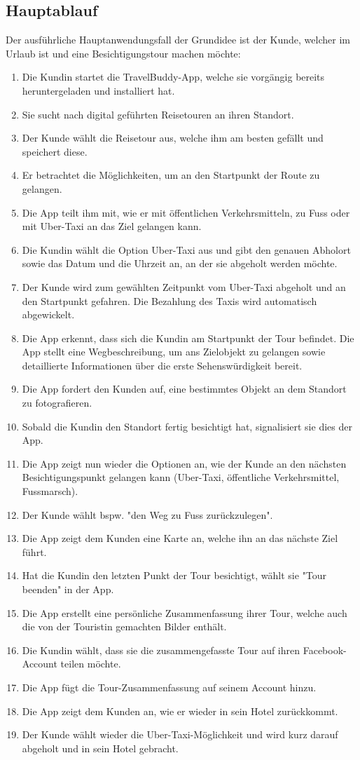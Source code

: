\subsection{Hauptablauf}\label{Hauptablauf}
Der ausführliche Hauptanwendungsfall der Grundidee ist der Kunde, welcher im Urlaub ist und eine Besichtigungstour machen möchte:
\begin{enumerate}
\item Die Kundin startet die TravelBuddy-App, welche sie vorgängig bereits heruntergeladen und installiert hat.
\item Sie sucht nach digital geführten Reisetouren an ihren Standort.
\item Der Kunde wählt die Reisetour aus, welche ihm am besten gefällt und speichert diese.
\item Er betrachtet die Möglichkeiten, um an den Startpunkt der Route zu gelangen.
\item Die App teilt ihm mit, wie er mit öffentlichen Verkehrsmitteln, zu Fuss oder mit Uber-Taxi an das Ziel gelangen kann.
\item Die Kundin wählt die Option Uber-Taxi aus und gibt den genauen Abholort sowie das Datum und die Uhrzeit an, an der sie abgeholt werden möchte.
\item Der Kunde wird zum gewählten Zeitpunkt vom Uber-Taxi abgeholt und an den Startpunkt gefahren. Die Bezahlung des Taxis wird automatisch abgewickelt.
\item Die App erkennt, dass sich die Kundin am Startpunkt der Tour befindet. Die App stellt eine Wegbeschreibung, um ans Zielobjekt zu gelangen sowie detaillierte Informationen über die erste Sehenswürdigkeit bereit.
\item Die App fordert den Kunden auf, eine bestimmtes Objekt an dem Standort zu fotografieren.
\item Sobald die Kundin den Standort fertig besichtigt hat, signalisiert sie dies der App.
\item Die App zeigt nun wieder die Optionen an, wie der Kunde an den nächsten Besichtigungspunkt gelangen kann (Uber-Taxi, öffentliche Verkehrsmittel, Fussmarsch).
\item Der Kunde wählt bspw. "den Weg zu Fuss zurückzulegen".
\item Die App zeigt dem Kunden eine Karte an, welche ihn an das nächste Ziel führt.
\item Hat die Kundin den letzten Punkt der Tour besichtigt, wählt sie "Tour beenden" in der App.
\item Die App erstellt eine persönliche Zusammenfassung ihrer Tour, welche auch die von der Touristin gemachten Bilder enthält.
\item Die Kundin wählt, dass sie die zusammengefasste Tour auf ihren Facebook-Account teilen möchte.
\item Die App fügt die Tour-Zusammenfassung auf seinem Account hinzu.
\item Die App zeigt dem Kunden an, wie er wieder in sein Hotel zurückkommt.
\item Der Kunde wählt wieder die Uber-Taxi-Möglichkeit und wird kurz darauf abgeholt und in sein Hotel gebracht.
\end{enumerate}

